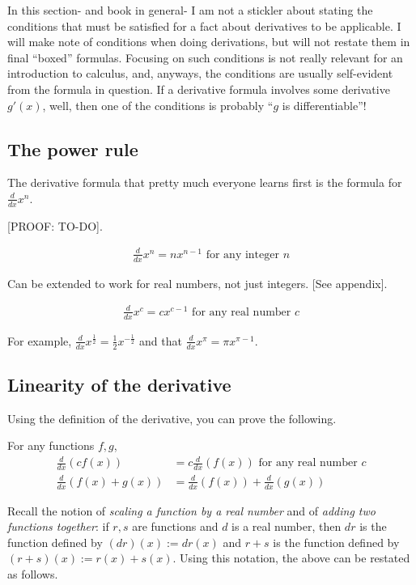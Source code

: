 \documentclass{article}
\begin{document}
In this section- and book in general- I am not a stickler about stating the conditions that must be satisfied for a fact about derivatives to be applicable. I will make note of conditions when doing derivations, but will not restate them in final ``boxed'' formulas. Focusing on such conditions is not really relevant for an introduction to calculus, and, anyways, the conditions are usually self-evident from the formula in question. If a derivative formula involves some derivative $g'(x)$, well, then one of the conditions is probably ``$g$ is differentiable''!

\subsection*{The power rule}

The derivative formula that pretty much everyone learns first is the formula for $\frac{d}{dx} x^n$.

[PROOF: TO-DO].

\begin{align*}
    \frac{d}{dx} x^n = nx^{n - 1} \text{ for any integer $n$}
\end{align*}

Can be extended to work for real numbers, not just integers. [See appendix].

\begin{align*}
    \boxed
    {
        \frac{d}{dx} x^c = cx^{c - 1} \text{ for any real number $c$}
    }
\end{align*}

For example, $\frac{d}{dx} x^{\frac{1}{2}} = \frac{1}{2}x^{-\frac{1}{2}}$ and that $\frac{d}{dx} x^\pi = \pi x^{\pi - 1}$.

\subsection*{Linearity of the derivative}

Using the definition of the derivative, you can prove the following.

For any functions $f, g$,
\begin{align*}
    \frac{d}{dx}(cf(x)) &= c \frac{d}{dx}(f(x)) \text{ for any real number $c$} \\
    \frac{d}{dx}(f(x) + g(x)) &= \frac{d}{dx}(f(x)) + \frac{d}{dx}(g(x))
\end{align*}

Recall the notion of \textit{scaling a function by a real number} and of \textit{adding two functions together}: if $r, s$ are functions and $d$ is a real number, then $dr$ is the function defined by $(dr)(x) := dr(x)$ and $r + s$ is the function defined by $(r + s)(x) := r(x) + s(x)$. Using this notation, the above can be restated as follows. 
\end{document}
